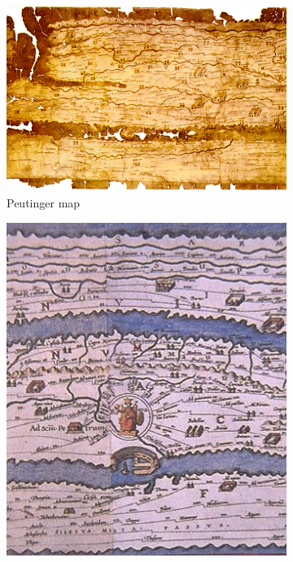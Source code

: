 \begin{figure}[!htb]
  \captionsetup[subfigure]{justification=centering}
  \centering
  \begin{subfigure}[t]{0.4\textwidth}
    \includegraphics[width=\textwidth]{images/history/peutinger.png}
    \caption{Peutinger map}
    \label{fig:peutinger}
  \end{subfigure}
  \hfill
  \begin{subfigure}[t]{0.4\textwidth}
    \includegraphics[width=\textwidth]{images/history/peutinger_rom.jpg}

\end{subfigure}
\end{figure}

